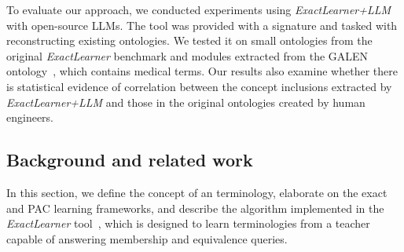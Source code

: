 %
To evaluate our approach, we conducted experiments using \emph{ExactLearner+LLM} with open-source \glspl{LLM}.
%
The tool was provided with a signature and tasked with reconstructing existing ontologies.
%
We tested it on small ontologies from the original \emph{ExactLearner} benchmark and modules extracted from the GALEN ontology~\cite{Rector2008TheGH}, which contains medical terms.
%
Our results also examine whether there is statistical evidence of correlation between the concept inclusions extracted by \emph{ExactLearner+LLM} and those in the original ontologies created by human engineers.
%


\subsection{Background and related work}
\label{subsec:active-learning-ontologies}
%
In this section, we define the concept of an \EL terminology, elaborate on the exact and \gls{PAC} learning frameworks, and describe the algorithm implemented in the \emph{ExactLearner} tool~\cite{DBLP:conf/kr/DuarteKO18}, which is designed to learn \EL terminologies from a teacher capable of answering membership and equivalence queries.
%
